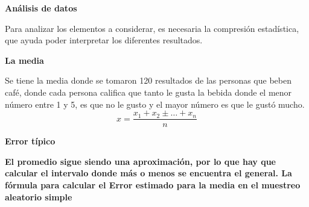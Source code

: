 \documentclass{article} %
\begin{document}
\noindent \textbf{}

\noindent \textbf{}

\noindent \textbf{}

\noindent \textbf{}

\noindent 

\noindent \textbf{}

\noindent \textbf{}

\noindent \textbf{}

\noindent \textbf{}

\noindent \textbf{}

\noindent \textbf{}

\noindent \textbf{}

\noindent \textbf{}

\noindent \textbf{}


{\bf  An\'{a}lisis de datos}

\noindent Para analizar los elementos a considerar, es necesaria la compresi\'{o}n estad\'{i}stica, que ayuda poder interpretar los diferentes resultados.

\noindent \textbf{}


{\bf     La media}

\noindent Se tiene la media donde se tomaron 120 resultados de las personas que beben caf\'{e}, donde cada persona califica que tanto le gusta la bebida donde el menor n\'{u}mero entre 1 y 5, es que no le gusto y el mayor n\'{u}mero es que le gust\'{o} mucho.
\[x=\frac{x_1+x_2\pm \dots +x_n}{n}\] 


{\bf   Error t\'{i}pico}

\noindent 
{\bf }

\noindent 
{\bf El promedio sigue siendo una aproximaci\'{o}n, por lo que hay que calcular el intervalo donde m\'{a}s o menos se encuentra el general. La f\'{o}rmula para calcular el Error estimado para la media en el muestreo aleatorio simple}

\noindent \textbf{}

\noindent \textbf{}

\noindent 

\noindent 

\noindent  

\noindent 

\noindent 

\noindent 

\noindent 
\end{document}
